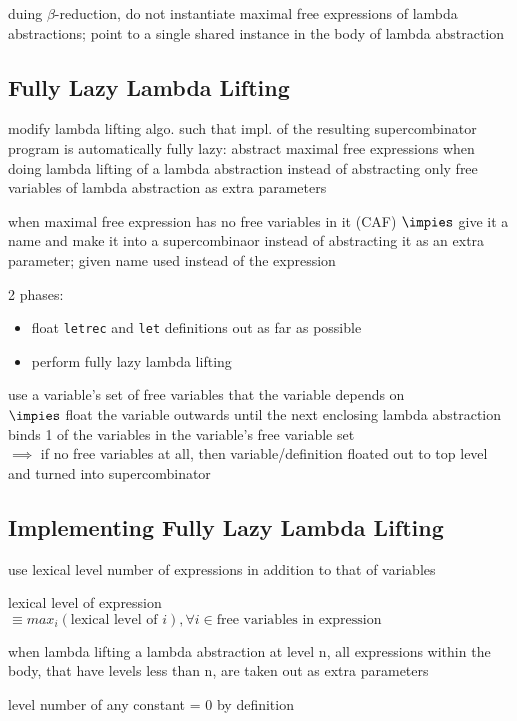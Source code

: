 \documentclass[8pt]{extarticle}
\begin{document}
\begin{multicols*}{2}
\begin{tblr}[]{}
duing $\beta$-reduction, do not instantiate maximal free expressions of lambda abstractions; point to a single shared instance in the body of lambda abstraction

\subsection{Fully Lazy Lambda Lifting}

modify lambda lifting algo. such that impl. of the resulting supercombinator program is automatically fully lazy: abstract maximal free expressions when doing lambda lifting of a lambda abstraction instead of abstracting only free variables of lambda abstraction as extra parameters

when maximal free expression has no free variables in it (CAF) $\impies$ give it a name and make it into a supercombinaor instead of abstracting it as an extra parameter; given name used instead of the expression

2 phases:
\begin{itemize}
\item float \verb|letrec| and \verb|let| definitions out as far as possible
\item perform fully lazy lambda lifting
\end{itemize}

use a variable's set of free variables that the variable depends on\\
$\impies$ float the variable outwards until the next enclosing lambda abstraction binds 1 of the variables in the variable's free variable set\\
$\implies$ if no free variables at all, then variable/definition floated out to top level and turned into supercombinator

\subsection{Implementing Fully Lazy Lambda Lifting}

use lexical level number of expressions in addition to that of variables

lexical level of expression $\equiv max_i(\text{lexical level of } i), \forall i \in \text{free variables in expression}$ 

when lambda lifting a lambda abstraction at level n, all expressions within the body, that have levels less than n, are taken out as extra parameters

level number of any constant = 0 by definition


\end{tblr}
\end{multicols*}
\end{document}
